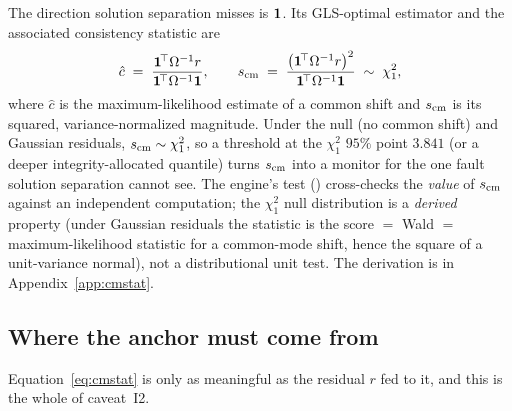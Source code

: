 The direction solution separation misses is $\bm 1{}$. Its GLS-optimal estimator
and the associated consistency statistic are
\begin{equation}
  \hat c \;=\; \frac{\bm 1^{\!\top}\Omega^{-1} r}{\bm 1^{\!\top}\Omega^{-1}\bm 1},
  \qquad
  s_{\mathrm{cm}}{} \;=\; \frac{\big(\bm 1^{\!\top}\Omega^{-1} r\big)^2}
                    {\bm 1^{\!\top}\Omega^{-1}\bm 1}
             \;\sim\; \chi^2_1,
  \label{eq:cmstat}
\end{equation}
where $\hat c$ is the maximum-likelihood estimate of a common shift and $s_{\mathrm{cm}}{}$ is
its squared, variance-normalized magnitude. Under the null (no common shift) and
Gaussian residuals, $s_{\mathrm{cm}}{}\sim\chi^2_1$, so a threshold at the $\chi^2_1$
$95\%$ point $3.841$ (or a deeper integrity-allocated quantile) turns $s_{\mathrm{cm}}{}$ into
a monitor for the one fault solution separation cannot see. The engine's
 test ()
cross-checks the \emph{value} of $s_{\mathrm{cm}}{}$ against an independent 
computation; the $\chi^2_1$ null distribution is a \Proven{} \emph{derived} property
(under Gaussian residuals the statistic is the score $=$ Wald $=$ maximum-likelihood
statistic for a common-mode shift, hence the square of a unit-variance normal), not
a distributional unit test. The derivation is in Appendix~\ref{app:cmstat}.

\subsection{Where the anchor must come from}
\label{sec:anchor}

Equation~\eqref{eq:cmstat} is only as meaningful as the residual $r$ fed to it, and
this is the whole of caveat~I2.

